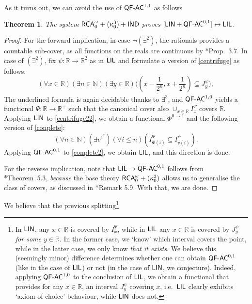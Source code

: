 \documentclass[reqno]{amsart}
\newtheorem{thm}{Theorem}
\newcommand\be{\begin{equation}}
\newcommand\ee{\end{equation}}
\def\RCA{\textup{\textsf{RCA}}}
\def\RCAo{\textup{\textsf{RCA}}_{0}^{\omega}}
\def\N{{\mathbb  N}}
\def\R{{\mathbb  R}}
\def\di{\rightarrow}
\def\asa{\leftrightarrow}
\def\QFAC{\textup{\textsf{QF-AC}}}
\def\LIN{\textup{\textsf{LIN}}}
\def\LIL{\textup{\textsf{LIL}}}
\numberwithin{equation}{section}
\numberwithin{thm}{section}
\begin{document}
% 
As it turns out, we can avoid the use of $\QFAC^{1,1}$ as follows
\begin{thm}\label{kokken}
The system $\RCA_{0}^{\omega}+(\kappa_{0}^{3})+\textsf{\textup{IND}}$ proves $[\LIN+\QFAC^{0,1}]\asa \LIL$.
\end{thm}
\begin{proof}
For the forward implication, in case $\neg(\exists^{2})$, the rationals provides a countable sub-cover, as all functions on the reals are continuous by \cite{kohlenbach2}*{Prop.\ 3.7}.  In case of $(\exists^{2})$, fix $\psi:\R\di \R^{2}$ as in $\LIL$ and formulate a version of \eqref{centrifuge} as follows:
\be\label{centrifuge22}\textstyle
(\forall x\in \R)(\exists n\in \N)\underline{(\exists y\in \R)\big((x-\frac{1}{2^{n}}, x+\frac{1}{2^{n}})\subseteq J_{y}^{\psi}\big)}, 
\ee
The underlined formula is again decidable thanks to $\exists^{3}$, and $\QFAC^{1,0}$ yields a functional $\Psi:\R\di \R^{+}$ such that the canonical cover also $\cup_{x\in \R}I_{x}^{\Psi}$ covers $\R$. 
Applying $\LIN$ to \eqref{centrifuge22}, we obtain a functional $\Phi^{0\di 1}$ and the following version of \eqref{conplete}:
\be\label{conplete2}
(\forall n\in \N)(\exists v^{1^{*}})(\forall i\leq n)(I^{\Psi}_{\Phi(i)}\subseteq I_{v(i)}^{\psi}).
\ee
Applying $\QFAC^{0,1}$ to \eqref{conplete2}, we obtain $\LIL$, and this direction is done.  

\smallskip

For the reverse implication, note that $\LIL\di \QFAC^{0,1}$ follows from \cite{dagsamV}*{Theorem~5.3}, \emph{because} the base theory $\RCAo+(\kappa_{0}^{3})$ allows us to generalise the class of covers, as discussed in \cite{dagsamV}*{Remark 5.9}.  With that, we are done. 
\end{proof}
We believe that the previous 
splitting\footnote{In $\LIN$, any $x\in \R$ is covered by $I_{x}^{\Psi}$, while in $\LIL$ any $x\in \R$ is covered by $J_{y}^{\psi}$ \emph{for some $y\in \R$}.  
In the former case, we `know' which interval covers the point, while in the latter case, we only know \emph{that it exists}.    
We believe this (seemingly minor) difference determines whether one can obtain $\QFAC^{0,1}$ (like in the case of $\LIL$) or not (in the case of $\LIN$, we conjecture).  
Indeed, applying $\QFAC^{1,0}$ to the conclusion of $\LIL$, we obtain a functional that provides for any $x\in \R$, an interval $J_{y}^{\psi}$ covering $x$, i.e.\ $\LIL$ clearly exhibits `axiom of choice' behaviour, while $\LIN$ does not.} 
\end{document}
